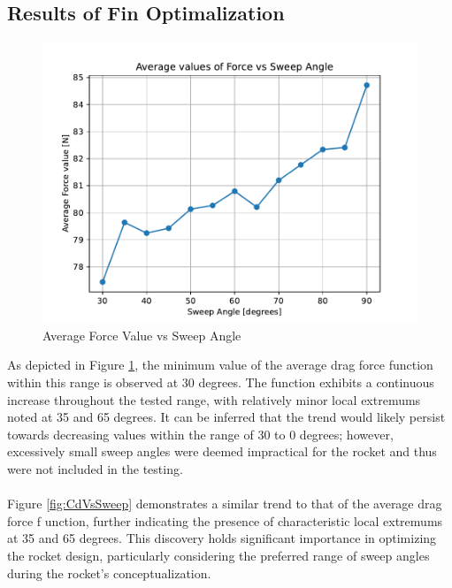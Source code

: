 \documentclass{article}
\begin{document}
\subsection{Results of Fin Optimalization}
\begin{figure}[H]
    \centering
    \includegraphics[width=1\textwidth]{../data/R6-Parametric-Fins/ForceVsSweepAngle.pdf}
    \caption{Average Force Value vs Sweep Angle}
    \label{fig:ForceVsSweepAngle}
\end{figure}
As depicted in Figure \ref{fig:ForceVsSweepAngle}, the minimum value of the average drag force 
function within this range is observed at 30 degrees. The function exhibits a continuous increase 
throughout the tested range, with relatively minor local extremums noted at 35 and 65 degrees. It 
can be inferred that the trend would likely persist towards decreasing values within the range of 
30 to 0 degrees; however, excessively small sweep angles were deemed impractical for the rocket 
and thus were not included in the testing.\\\\
Figure \ref{fig:CdVsSweep} demonstrates a similar trend to that of the average drag force f
unction, further indicating the presence of characteristic local extremums at 35 and 65 degrees. 
This discovery holds significant importance in optimizing the rocket design, particularly 
considering the preferred range of sweep angles during the rocket's conceptualization.
\end{document}
